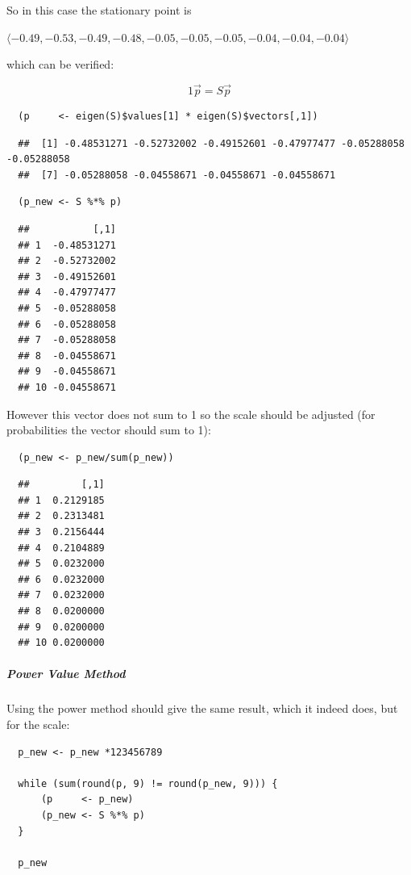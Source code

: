 \documentclass[11pt]{article}
\begin{document}
So in this case the stationary point is

\(\langle -0.49, -0.53, -0.49, -0.48, -0.05, -0.05, -0.05, -0.04, -0.04, -0.04 \rangle\)

which can be verified:

$$
1 \vec{p} = S\vec{p}
$$

\begin{verbatim}
  (p     <- eigen(S)$values[1] * eigen(S)$vectors[,1])
\end{verbatim}

\begin{verbatim}
  ##  [1] -0.48531271 -0.52732002 -0.49152601 -0.47977477 -0.05288058 -0.05288058
  ##  [7] -0.05288058 -0.04558671 -0.04558671 -0.04558671
\end{verbatim}

\begin{verbatim}
  (p_new <- S %*% p)
\end{verbatim}

\begin{verbatim}
  ##           [,1]
  ## 1  -0.48531271
  ## 2  -0.52732002
  ## 3  -0.49152601
  ## 4  -0.47977477
  ## 5  -0.05288058
  ## 6  -0.05288058
  ## 7  -0.05288058
  ## 8  -0.04558671
  ## 9  -0.04558671
  ## 10 -0.04558671
\end{verbatim}

However this vector does not sum to 1 so the scale should be adjusted
(for probabilities the vector should sum to 1):

\begin{verbatim}
  (p_new <- p_new/sum(p_new))
\end{verbatim}

\begin{verbatim}
  ##         [,1]
  ## 1  0.2129185
  ## 2  0.2313481
  ## 3  0.2156444
  ## 4  0.2104889
  ## 5  0.0232000
  ## 6  0.0232000
  ## 7  0.0232000
  ## 8  0.0200000
  ## 9  0.0200000
  ## 10 0.0200000
\end{verbatim}

\subparagraph{Power Value Method}
\label{power-value-method}
Using the power method should give the same result, which it indeed
does, but for the scale:

\begin{verbatim}
  p_new <- p_new *123456789

  while (sum(round(p, 9) != round(p_new, 9))) {
      (p     <- p_new)
      (p_new <- S %*% p)
  }

  p_new
\end{verbatim}
\end{document}
